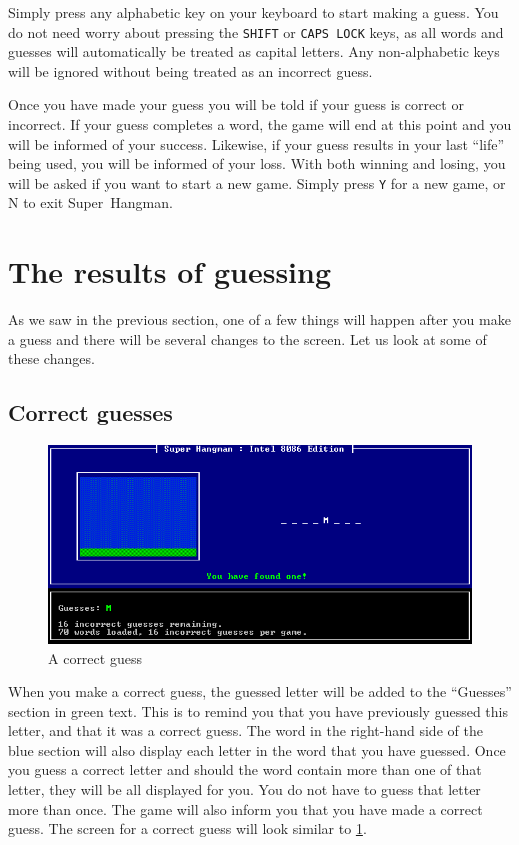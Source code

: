 Simply press any alphabetic key on your keyboard to start making a
guess. You do not need worry about pressing the \texttt{SHIFT} or
\texttt{CAPS LOCK} keys, as all words and guesses will automatically
be treated as capital letters. Any non-alphabetic keys will be ignored
without being treated as an incorrect guess.

Once you have made your guess you will be told if your guess is correct
or incorrect. If your guess completes a word, the game will end at
this point and you will be informed of your success. Likewise, if
your guess results in your last ``life'' being used, you will be
informed of your loss. With both winning and losing, you will be asked
if you want to start a new game. Simply press \texttt{Y} for a new
game, or N to exit \mbox{Super Hangman}.


\section{The results of guessing}

As we saw in the previous section, one of a few things will happen
after you make a guess and there will be several changes to the screen.
Let us look at some of these changes.


\subsection{Correct guesses}

\begin{figure}[h]
\includegraphics[scale=0.5]{correct_guess}

\caption{\label{fig:A-correct-guess}A correct guess}
\end{figure}


When you make a correct guess, the guessed letter will be added to
the ``Guesses'' section in green text. This is to remind you that
you have previously guessed this letter, and that it was a correct
guess. The word in the right-hand side of the blue section will also
display each letter in the word that you have guessed. Once you guess
a correct letter and should the word contain more than one of that
letter, they will be all displayed for you. You do not have to guess
that letter more than once. The game will also inform you that you
have made a correct guess. The screen for a correct guess will look
similar to \ref{fig:A-correct-guess}.


